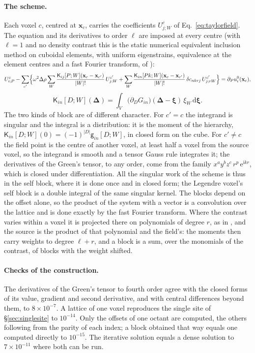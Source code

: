 \documentclass[11pt,a4paper]{article}
\newcommand{\dd}{\mathrm{d}}
\begin{document}
\paragraph{The scheme.} Each voxel $c$, centred at $\mathbf x_c$, carries the coefficients
$U^c_{j;W}$ of Eq.~\eqref{eq:taylorfield}. The equation and its derivatives to order $\ell$ are imposed
at every centre (with $\ell=1$ and no density contrast this is the static numerical equivalent
inclusion method on cuboidal elements, with uniform eigenstrains, equivalence at the element centres and
a fast Fourier transform, of \citet{Zhou2011}):
\begin{equation}\label{eq:gradlattice}
  U^c_{i;P}-\sum_{c'}\Bigl\{\omega^2\Delta\rho\sum_{W}\frac{\mathsf K_{ij}[P;W](\mathbf x_c-\mathbf x_{c'})}{|W|!}\,U^{c'}_{j;W}
  +\sum_{W}\frac{\mathsf K_{in}[Pk;W](\mathbf x_c-\mathbf x_{c'})}{|W|!}\,\delta c_{nkrj}\,U^{c'}_{j;rW}\Bigr\}
  =\partial_Pu^0_i(\mathbf x_c),
\end{equation}
\begin{equation}\label{eq:gradkernel}
  \mathsf K_{in}[D;W](\boldsymbol\Delta)=\int_{V}\bigl(\partial_DG_{in}\bigr)(\boldsymbol\Delta-\boldsymbol\xi)\,
  \xi_W\,\dd\boldsymbol\xi .
\end{equation}
The two kinds of block are of different character. For $c'=c$ the integrand is singular and the
integral is a distribution: it is the moment of the hierarchy,
$\mathsf K_{in}[D;W](0)=(-1)^{|D|}\mathsf g_{in}[D;W]$, in closed form on the cube. For $c'\neq c$ the
field point is the centre of another voxel, at least half a voxel from the source voxel, so the
integrand is smooth and a tensor Gauss rule integrates it; the derivatives of the Green's tensor, to
any order, come from the family $x^ay^bz^c\,r^p\,\mathrm{e}^{\mathrm{i}kr}$, which is closed under
differentiation. All the singular work of the scheme is thus in the self block, where it is done once
and in closed form; the Legendre voxel's self block is a double integral of the same singular kernel.
The blocks depend on the offset alone, so the product of the system with a vector is a convolution over
the lattice and is done exactly by the fast Fourier transform. Where the contrast varies within a voxel
it is projected there on polynomials of degree $r$, as in \citet{NestorError2026}, and the source is the
product of that polynomial and the field's: the moments then carry weights to degree $\ell+r$, and a
block is a sum, over the monomials of the contrast, of blocks with the weight shifted.

\paragraph{Checks of the construction.} The derivatives of the Green's tensor to fourth order agree
with the closed forms of its value, gradient and second derivative, and with central differences beyond
them, to $8\times10^{-7}$. A lattice of one voxel reproduces the single site of
\S\ref{sec:singlesite} to $10^{-14}$. Only the offsets of one octant are computed, the others following
from the parity of each index; a block obtained that way equals one computed directly to $10^{-15}$.
The iterative solution equals a dense solution to $7\times10^{-11}$ where both can be run.
\end{document}
